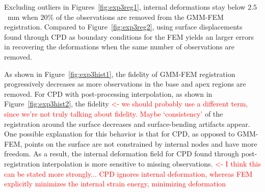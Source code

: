\documentclass[journal]{IEEEtran}
\newcommand{\comment}[1]{\textcolor{red}{#1}}
\begin{document}
Excluding outliers in Figures~\ref{fig:exp3reg1}, internal deformations stay below $2.5$~mm when $20\%$ of the observations are removed from the GMM-FEM registration. Compared to Figure~\ref{fig:exp3reg2}, using surface displacements found through CPD as boundary conditions for the FEM yields an larger errors in recovering the deformations when the same number of observations are removed.

As shown in Figure~\ref{fig:exp3hist1}, the fidelity of GMM-FEM registration progressively decreases as more observations in the base and apex regions are removed. For CPD with post-processing interpolation, as shown in Figure~\ref{fig:exp3hist2}, the fidelity \comment{<- we should probably use a different term, since we're not truly talking about fidelity.  Maybe `consistency'} of the registration around the surface decreases and surface-bending artifacts appear. One possible explanation for this behavior is that for CPD, as opposed to GMM-FEM, points on the surface are not constrained by internal nodes and have more freedom. As a result, the internal deformation field for CPD found through post-registration interpolation is more sensitive to missing observations. \comment{<- I think this can be stated more strongly... CPD ignores internal deformation, whereas FEM explicitly minimizes the internal strain energy, minimizing deformation}
\end{document}
